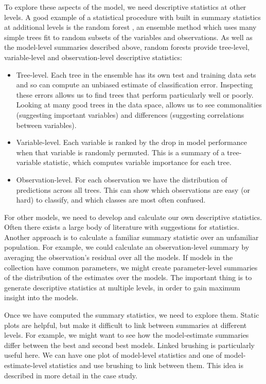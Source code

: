 \documentclass[preprint]{imsart}
\begin{document}
To explore these aspects of the model, we need descriptive statistics at other levels. A good example of a statistical procedure with built in summary statistics at additional levels is the random forest \citep{breiman:2001}, an ensemble method which uses many simple trees fit to random subsets of the variables and observations. As well as the model-level summaries described above, random forests provide tree-level, variable-level and observation-level descriptive statistics:

\begin{itemize}
  \item Tree-level.  Each tree in the ensemble has its own test and training data sets and so can compute an unbiased estimate of classification error.  Inspecting these errors allows us to find trees that perform particularly well or poorly.  Looking at many good trees in the data space, allows us to see commonalities (suggesting important variables) and differences (suggesting correlations between variables).

  \item Variable-level.  Each variable is ranked by the drop in model performance when that variable is randomly permuted. This is a summary of a tree-variable statistic, which computes variable importance for each tree.

  \item Observation-level.  For each observation we have the distribution of predictions across all trees.  This can show which observations are easy (or hard) to classify, and which classes are most often confused.

\end{itemize}

For other models, we  need to develop and calculate our own descriptive statistics. Often there exists a large body of literature with suggestions for statistics. Another approach is to calculate a familiar summary statistic over an unfamiliar population. For example, we could calculate an observation-level summary by averaging the observation's residual over all the models. If models in the collection have common parameters, we might create parameter-level summaries of the distribution of the estimates over the models. The important thing is to generate descriptive statistics at multiple levels, in order to gain maximum insight into the models.

Once we have computed the summary statistics, we need to explore them. Static plots are helpful, but make it difficult to link between summaries at different levels. For example, we might want to see how the model-estimate summaries differ between the best and second best models. Linked brushing is particularly useful here. We can have one plot of model-level statistics and one of model-estimate-level statistics and use brushing to link between them. This idea is described in more detail in the case study.
\end{document}
